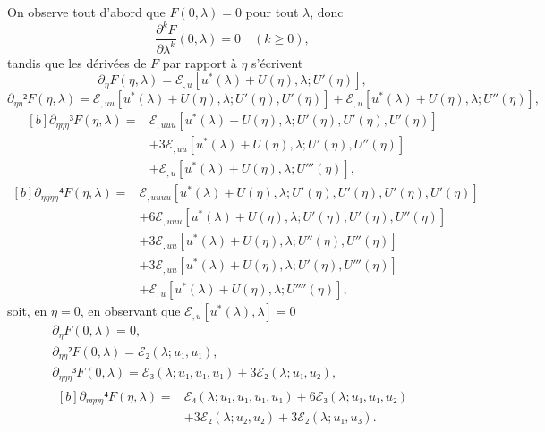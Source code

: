 \documentclass[12pt, final]{scrartcl}
\theoremstyle{definition}
\begin{document}
On observe tout d'abord que \(F(0, λ) = 0\) pour tout \(λ\), donc
\begin{equation}
  \frac{∂^k F}{∂ λ^k}(0, λ) = 0 \quad (k ≥ 0),
\end{equation}
tandis que les dérivées de \(F\) par rapport à \(η\) s'écrivent
\begin{equation}
  ∂_{η} F(η, λ) = ℰ_{, u}[u^{\ast}(λ) + U(η), λ; U'(η)],
\end{equation}
\begin{equation}
  ∂_{ηη}² F(η, λ) = ℰ_{, uu} [u^{\ast}(λ) + U(η), λ; U'(η), U'(η)] + ℰ_{, u} [u^{\ast}(λ) + U(η), λ; U''(η)],
\end{equation}
\begin{equation*}
  \begin{aligned}[b]
    ∂_{ηηη}³ F(η, λ) ={}
    & ℰ_{, uuu} [u^{\ast}(λ) + U(η), λ; U'(η), U'(η), U'(η)]\\
    & + 3ℰ_{, uu}[u^{\ast}(λ) + U(η), λ; U'(η), U''(η)]\\
    & + ℰ_{, u}[u^{\ast}(λ) + U(η), λ; U'''(η)],
  \end{aligned}
\end{equation*}
\begin{equation}
  \begin{aligned}[b]
    ∂_{ηηηη}⁴ F(η, λ) ={}
    & ℰ_{, uuuu}[u^{\ast}(λ) + U(η), λ; U'(η), U'(η), U'(η), U'(η)]\\
    & + 6ℰ_{,uuu}[u^{\ast}(λ) + U(η), λ; U'(η), U'(η), U''(η)]\\
    & + 3ℰ_{, uu}[u^{\ast}(λ) + U(η), λ; U''(η), U''(η)]\\
    & + 3ℰ_{, uu}[u^{\ast}(λ) + U(η), λ; U'(η), U'''(η)]\\
    & +ℰ_{, u}[u^{\ast}(λ) + U(η), λ ; U''''(η)],
  \end{aligned}
\end{equation}
soit, en \(η = 0\), en observant que \(ℰ_{, u}[u^{\ast}(λ), λ] = 0\)
\begin{gather}
  ∂_{η} F(0, λ) = 0,\\
  ∂_{ηη}² F(0, λ) =ℰ₂(λ ; u₁, u₁),\\
  ∂_{ηηη}³ F(0, λ) = ℰ₃(λ; u₁, u₁, u₁) + 3ℰ₂(λ; u₁, u₂),\\
  \begin{aligned}[b]
    ∂_{ηηηη}⁴ F(η, λ) ={}
    & ℰ₄(λ; u₁, u₁, u₁, u₁) + 6ℰ₃(λ; u₁, u₁, u₂)\\
    & + 3ℰ₂(λ; u₂, u₂) + 3ℰ₂(λ; u₁, u₃).
  \end{aligned}
\end{gather}
\end{document}
